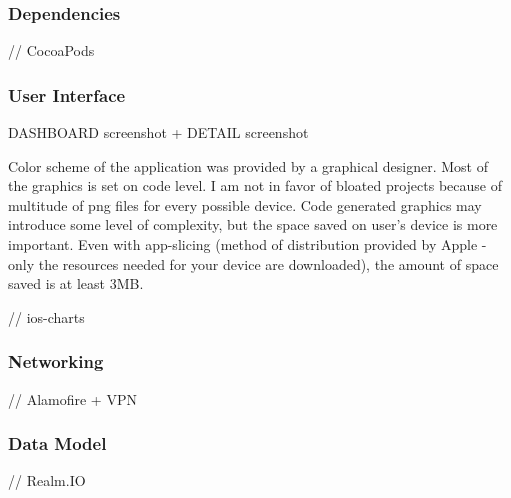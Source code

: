 \subsubsection*{Dependencies}

// CocoaPods

\subsubsection*{User Interface}

DASHBOARD screenshot + DETAIL screenshot

Color scheme of the application was provided by a graphical designer. Most of the graphics is set on code level. I am not in favor of bloated projects because of multitude of png files for every possible device. Code generated graphics may introduce some level of complexity, but the space saved on user's device is more important. Even with app-slicing (method of distribution provided by Apple - only the resources needed for your device are downloaded), the amount of space saved is at least 3MB.

// ios-charts

\subsubsection*{Networking}

// Alamofire + VPN

\subsubsection*{Data Model}

// Realm.IO